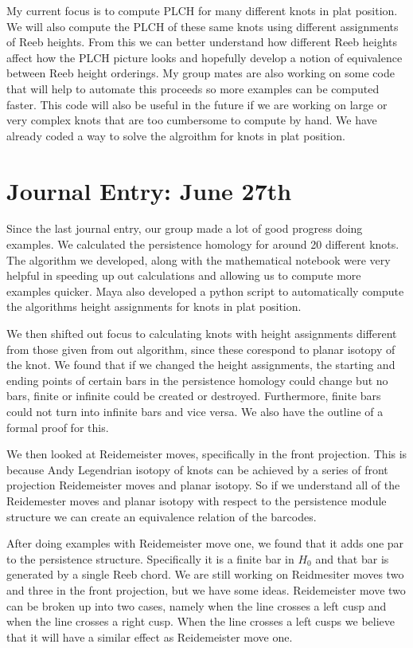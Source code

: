 \documentclass[11pt,oneside]{amsart}
\begin{document}
My current focus is to compute PLCH for many different knots in plat position. We will also compute the PLCH of these same knots using different assignments of Reeb heights. From this we can better understand how different Reeb heights affect how the PLCH picture looks and hopefully develop a notion of equivalence between Reeb height orderings. My group mates are also working on some code that will help to automate this proceeds so more examples can be computed faster. This code will also be useful in the future if we are working on large or very complex knots that are too cumbersome to compute by hand. We have already coded a way to solve the algroithm for knots in plat position.


\section{Journal Entry: June 27th}

Since the last journal entry, our group made a lot of good progress doing examples. We calculated the persistence homology for around 20 different knots. The algorithm we developed, along with the mathematical notebook were very helpful in speeding up out calculations and allowing us to compute more examples quicker. Maya also developed a python script to automatically compute the algorithms height assignments for knots in plat position. 
\newline

We then shifted out focus to calculating knots with height assignments different from those given from out algorithm, since these corespond to planar isotopy of the knot. We found that if we changed the height assignments, the starting and ending points of certain bars in the persistence homology could change but no bars, finite or infinite could be created or destroyed. Furthermore, finite bars could not turn into infinite bars and vice versa. We also have the outline of a formal proof for this.
\newline

We then looked at Reidemeister moves, specifically in the front projection. This is because Andy Legendrian isotopy of knots can be achieved by a series of front projection Reidemeister moves and planar isotopy. So if we understand all of the Reidemester moves and planar isotopy with respect to the persistence module structure we can create an equivalence relation of the barcodes.
\newline

After doing examples with Reidemeister move one, we found that it adds one par to the persistence structure. Specifically it is a finite bar in $H_0$ and that bar is generated by a single Reeb chord. We are still working on Reidmesiter moves two and three in the front projection, but we have some ideas. Reidemeister move two can be broken up into two cases, namely when the line crosses a left cusp and when the line crosses a right cusp. When the line crosses a left cusps we believe that it will have a similar effect as Reidemeister move one.
\newline
\end{document}
